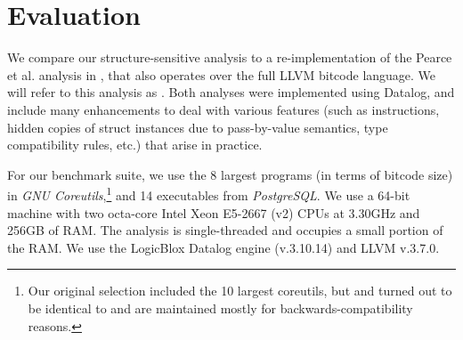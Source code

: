 \section{Evaluation}
\label{structsens/sect/eval}

We compare our structure-sensitive analysis to a
re-implementation of the Pearce et
al. \cite{paste/PearceKH04,toplas/PearceKH07} analysis in \cclyzer{},
that also operates over the full LLVM bitcode language. We will refer
to this analysis as \pearce{}. Both analyses were implemented using
Datalog, and include many enhancements to deal with various features
(such as  instructions, hidden copies of struct instances
due to pass-by-value semantics, type compatibility rules, etc.) that
arise in practice.

%
For our benchmark suite, we use the 8 largest programs (in terms of
bitcode size) in \emph{GNU Coreutils},\footnote{Our original selection
  included the 10 largest coreutils, but  and 
  turned out to be identical to  and are maintained mostly
  for backwards-compatibility reasons.}  and 14 executables from
\emph{PostgreSQL}. We use a 64-bit machine with two octa-core Intel
Xeon E5-2667 (v2) CPUs at 3.30GHz and 256GB of RAM. The analysis
is single-threaded and occupies a small portion of the RAM. We use
the LogicBlox Datalog engine (v.3.10.14) and LLVM v.3.7.0.


